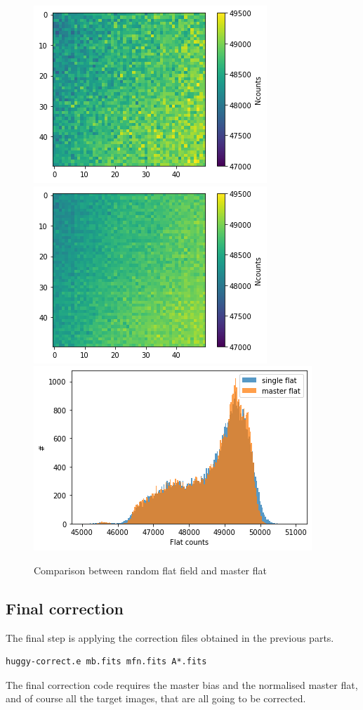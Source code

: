 \documentclass[a4paper,11pt,twocolumn]{article}
\begin{document}
\begin{figure}[H]
    \centering  
    \includegraphics[scale=0.32, angle=0]{../pictures/pre-reduction/flat.png}
    \includegraphics[scale=0.32, angle=0]{../pictures/pre-reduction/master_flat.png}
    \includegraphics[scale=0.35, angle=0]{../pictures/pre-reduction/flat_comp.png}
    \caption{Comparison between random flat field and master flat}
\end{figure}

\subsection{Final correction}
The final step is applying the correction files obtained in the 
previous parts.
\begin{lstlisting}
huggy-correct.e mb.fits mfn.fits A*.fits
\end{lstlisting}
The final correction code requires the master bias and the normalised 
master flat, and of course all the target images, that are all going to be 
 corrected.
\end{document}
